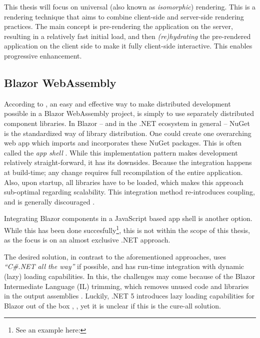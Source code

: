 This thesis will focus on universal (also known as \textit{isomorphic})
rendering. This is a rendering technique that aims to combine client-side and
server-side rendering practices. The main concept is pre-rendering the
application on the server, resulting in a relatively fast initial load, and then
\textit{(re)hydrating} the pre-rendered application on the client side to make
it fully client-side interactive. This enables progressive enhancement.
\autocite{MillerOsmani_2019}

\subsection{Blazor WebAssembly}
According to \textcite{Rappl_MunichNETMeetup_2020}, an easy and effective way to
make distributed development possible in a Blazor WebAssembly project, is simply
to use separately distributed component libraries. In Blazor -- and in the .NET
ecosystem in general -- NuGet is the
standardized way of library distribution. One could create one overarching web
app which imports and incorporates these NuGet packages. This is often called
the \textit{app shell} \autocite{Geers_2020}. While this implementation pattern
makes development relatively straight-forward, it has its downsides. Because the
integration happens at build-time; any change requires full recompilation of the
entire application. Also, upon startup, all libraries have to be loaded, which
makes this approach sub-optimal regarding scalability. This integration method
re-introduces coupling, and is generally discouraged \autocite{Jackson_2019}.

Integrating Blazor components in a JavaScript based app shell is another option.
While this has been done succesfully\footnote{See an example here:
}, this is
not within the scope of this thesis, as the focus is on an almost exclusive .NET
approach.

The desired solution, in contrast to the aforementioned approaches, uses
\textit{``C\#.NET all the way''} if possible, and has run-time integration with
dynamic (lazy) loading capabilities. In this, the challenges may come because of
the Blazor Intermediate Language (IL) trimming, which removes unused code and
libraries in the output assemblies \autocite{Latham_2020}. Luckily, .NET 5
introduces lazy loading capabilities for Blazor out of the box
,
\autocite{Kdouh_2020} \autocite{Rappl_dotNETConf_2020}, yet it is unclear if
this is the cure-all solution.

